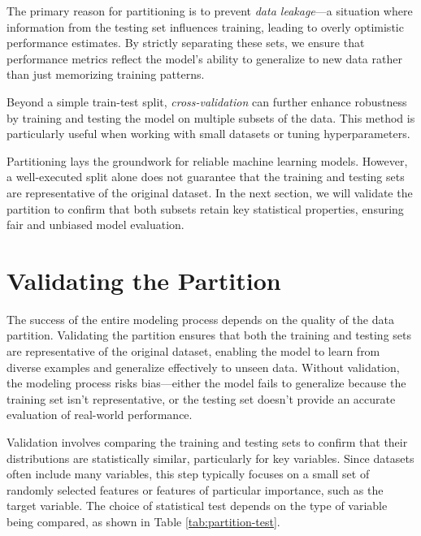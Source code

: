 \documentclass[
]{book}
\theoremstyle{definition}
\theoremstyle{definition}
\theoremstyle{definition}
\theoremstyle{definition}
\theoremstyle{remark}
\begin{document}
The primary reason for partitioning is to prevent \emph{data leakage}---a situation where information from the testing set influences training, leading to overly optimistic performance estimates. By strictly separating these sets, we ensure that performance metrics reflect the model's ability to generalize to new data rather than just memorizing training patterns.

Beyond a simple train-test split, \emph{cross-validation} can further enhance robustness by training and testing the model on multiple subsets of the data. This method is particularly useful when working with small datasets or tuning hyperparameters.

Partitioning lays the groundwork for reliable machine learning models. However, a well-executed split alone does not guarantee that the training and testing sets are representative of the original dataset. In the next section, we will validate the partition to confirm that both subsets retain key statistical properties, ensuring fair and unbiased model evaluation.

\section{Validating the Partition}\label{sec-validate-partition}

The success of the entire modeling process depends on the quality of the data partition. Validating the partition ensures that both the training and testing sets are representative of the original dataset, enabling the model to learn from diverse examples and generalize effectively to unseen data. Without validation, the modeling process risks bias---either the model fails to generalize because the training set isn't representative, or the testing set doesn't provide an accurate evaluation of real-world performance.

Validation involves comparing the training and testing sets to confirm that their distributions are statistically similar, particularly for key variables. Since datasets often include many variables, this step typically focuses on a small set of randomly selected features or features of particular importance, such as the target variable. The choice of statistical test depends on the type of variable being compared, as shown in Table \ref{tab:partition-test}.
\end{document}
